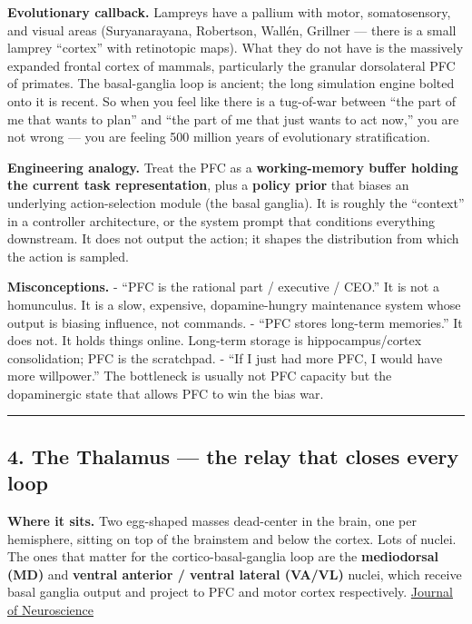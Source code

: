 \textbf{Evolutionary callback.} Lampreys have a pallium with motor, somatosensory, and visual areas (Suryanarayana, Robertson, Wallén, Grillner --- there is a small lamprey ``cortex'' with retinotopic maps). What they do not have is the massively expanded frontal cortex of mammals, particularly the granular dorsolateral PFC of primates. The basal-ganglia loop is ancient; the long simulation engine bolted onto it is recent. So when you feel like there is a tug-of-war between ``the part of me that wants to plan'' and ``the part of me that just wants to act now,'' you are not wrong --- you are feeling 500 million years of evolutionary stratification.

\textbf{Engineering analogy.} Treat the PFC as a \textbf{working-memory buffer holding the current task representation}, plus a \textbf{policy prior} that biases an underlying action-selection module (the basal ganglia). It is roughly the ``context'' in a controller architecture, or the system prompt that conditions everything downstream. It does not output the action; it shapes the distribution from which the action is sampled.

\textbf{Misconceptions.} - ``PFC is the rational part / executive / CEO.'' It is not a homunculus. It is a slow, expensive, dopamine-hungry maintenance system whose output is biasing influence, not commands. - ``PFC stores long-term memories.'' It does not. It holds things online. Long-term storage is hippocampus/cortex consolidation; PFC is the scratchpad. - ``If I just had more PFC, I would have more willpower.'' The bottleneck is usually not PFC capacity but the dopaminergic state that allows PFC to win the bias war.

\begin{center}\rule{0.5\linewidth}{0.5pt}\end{center}

\subsection{4. The Thalamus --- the relay that closes every loop}\label{06_neurology_101-the-thalamus-the-relay-that-closes-every-loop}

\textbf{Where it sits.} Two egg-shaped masses dead-center in the brain, one per hemisphere, sitting on top of the brainstem and below the cortex. Lots of nuclei. The ones that matter for the cortico-basal-ganglia loop are the \textbf{mediodorsal (MD)} and \textbf{ventral anterior / ventral lateral (VA/VL)} nuclei, which receive basal ganglia output and project to PFC and motor cortex respectively. \href{https://www.jneurosci.org/content/27/31/8161}{Journal of Neuroscience}

